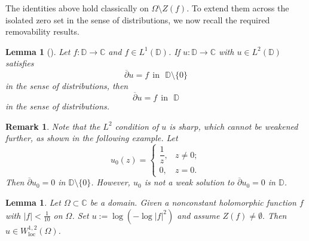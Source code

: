 \documentclass[12pt,twoside]{amsart}
\newcommand{\D}{\ensuremath{\mathbb{D}}}
\newcommand{\C}{\ensuremath{\mathbb{C}}}
\numberwithin{equation}{section}
\newtheorem{lemma}[theorem]{Lemma}
\numberwithin{definition}{section} %
\newtheorem{remark}{Remark}
\begin{document}
The identities above hold classically on $\Omega \setminus Z(f)$. To extend them across the isolated zero set in the sense of distributions, we now recall the required removability results.
\begin{lemma} [{\cite[Lemma A.1]{PZ2023}}]
\label{lm:ruojieinonedimension}
Let $f:\D  \rightarrow \C$ and $f\in L^1(\D)$. If $u: \D \rightarrow \C$ with $u\in L^2(\D)$ satisfies
$$
 \overline{\partial} u = f     \    \  \text{in} \ \  \   \D \setminus \{ 0\}
$$
in the sense of distributions,  then
$$
 \overline{\partial} u = f     \    \  \text{in} \ \  \   \D
$$
in the sense of distributions.
\end{lemma}
\begin{remark}
Note that the $L^2$ condition  of $u$  is sharp, which cannot be weakened further,  as shown in the following example.
 Let
\[
u_0(z)=
\begin{cases}
\dfrac{1}{z}, & z \neq 0; \\[4pt]
0, & z=0.
\end{cases}
\]
 Then $ \overline{\partial} u_0=0$ in $\D \setminus \{0 \}$. However,   $u_0$ is not a weak solution to $ \overline{\partial} u_0 = 0$ in $\D$.
\end{remark}
 \begin{lemma} \label{le:pacificidea1}
 Let $\Omega\subset\mathbb C$ be a domain. Given a nonconstant  holomorphic function $f$ with $| f| < \frac{1}{10}$ on $\Omega$. Set $u:=\log(-\log |f|^2) $ and assume
$
Z(f) \neq \emptyset.
$
Then
 $
u\in W^{1,2}_{\mathrm{loc}}(\Omega)$.
 \end{lemma}

\end{document}
